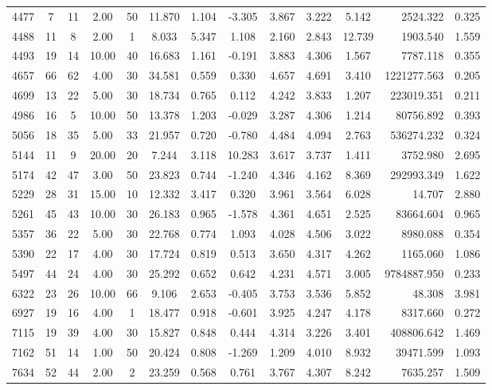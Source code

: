 \documentclass[mnsc]{informs3}
\begin{document}
\begin{APPENDICES}
\begin{longtable}{cccccccccccrc}
4477 & 7 & 11 & 2.00 & 50 & 11.870 & 1.104 & -3.305 & 3.867 & 3.222 & 5.142 & 2524.322 & 0.325 \\
4488 & 11 & 8 & 2.00 & 1 & 8.033 & 5.347 & 1.108 & 2.160 & 2.843 & 12.739 & 1903.540 & 1.559 \\
4493 & 19 & 14 & 10.00 & 40 & 16.683 & 1.161 & -0.191 & 3.883 & 4.306 & 1.567 & 7787.118 & 0.355 \\
4657 & 66 & 62 & 4.00 & 30 & 34.581 & 0.559 & 0.330 & 4.657 & 4.691 & 3.410 & 1221277.563 & 0.205 \\
4699 & 13 & 22 & 5.00 & 30 & 18.734 & 0.765 & 0.112 & 4.242 & 3.833 & 1.207 & 223019.351 & 0.211 \\
4986 & 16 & 5 & 10.00 & 50 & 13.378 & 1.203 & -0.029 & 3.287 & 4.306 & 1.214 & 80756.892 & 0.393 \\
5056 & 18 & 35 & 5.00 & 33 & 21.957 & 0.720 & -0.780 & 4.484 & 4.094 & 2.763 & 536274.232 & 0.324 \\
5144 & 11 & 9 & 20.00 & 20 & 7.244 & 3.118 & 10.283 & 3.617 & 3.737 & 1.411 & 3752.980 & 2.695 \\
5174 & 42 & 47 & 3.00 & 50 & 23.823 & 0.744 & -1.240 & 4.346 & 4.162 & 8.369 & 292993.349 & 1.622 \\
5229 & 28 & 31 & 15.00 & 10 & 12.332 & 3.417 & 0.320 & 3.961 & 3.564 & 6.028 & 14.707 & 2.880 \\
5261 & 45 & 43 & 10.00 & 30 & 26.183 & 0.965 & -1.578 & 4.361 & 4.651 & 2.525 & 83664.604 & 0.965 \\
5357 & 36 & 22 & 5.00 & 30 & 22.768 & 0.774 & 1.093 & 4.028 & 4.506 & 3.022 & 8980.088 & 0.354 \\
5390 & 22 & 17 & 4.00 & 30 & 17.724 & 0.819 & 0.513 & 3.650 & 4.317 & 4.262 & 1165.060 & 1.086 \\
5497 & 44 & 24 & 4.00 & 30 & 25.292 & 0.652 & 0.642 & 4.231 & 4.571 & 3.005 & 9784887.950 & 0.233 \\
6322 & 23 & 26 & 10.00 & 66 & 9.106 & 2.653 & -0.405 & 3.753 & 3.536 & 5.852 & 48.308 & 3.981 \\
6927 & 19 & 16 & 4.00 & 1 & 18.477 & 0.918 & -0.601 & 3.925 & 4.247 & 4.178 & 8317.660 & 0.272 \\
7115 & 19 & 39 & 4.00 & 30 & 15.827 & 0.848 & 0.444 & 4.314 & 3.226 & 3.401 & 408806.642 & 1.469 \\
7162 & 51 & 14 & 1.00 & 50 & 20.424 & 0.808 & -1.269 & 1.209 & 4.010 & 8.932 & 39471.599 & 1.093 \\
7634 & 52 & 44 & 2.00 & 2 & 23.259 & 0.568 & 0.761 & 3.767 & 4.307 & 8.242 & 7635.257 & 1.509 \\

\end{longtable}
\end{APPENDICES}
\end{document}
